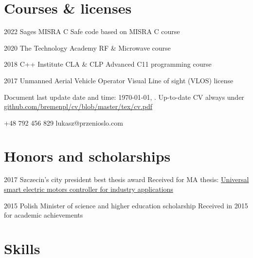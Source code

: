 \documentclass{tccv}
\begin{document}
\section{Courses \& licenses}

\begin{yearlist}

\item{2022}
     {Sages MISRA C}
     {Safe code based on MISRA C course}
     
\item{2020}
     {The Technology Academy}
     {RF \& Microwave course}

\item{2018}
     {C++ Institute CLA \& CLP}
     {Advanced C11 programming course}

\item{2017}
     {Unmanned Aerial Vehicle Operator}
     {Visual Line of sight (VLOS) license}

\end{yearlist}

\vspace*{\fill} %

{\scriptsize Document last update date and time: \today, \currenttime. Up-to-date CV always under  \href{https://github.com/bremenpl/cv/blob/master/tex/cv.pdf}{github.com/bremenpl/cv/blob/master/tex/cv.pdf}}

    {+48 792 456 829}
    {lukasz@przenioslo.com}
    
\section{Honors and scholarships}

\begin{yearlist}

\item{2017}
     {Szczecin's city president best thesis award}
     {Received for MA thesis: \href{https://github.com/bremenpl/praca_mgr}{Universal smart electric motors controller for industry applications}} 
     
\item{2015}
     {Polish Minister of science and higher education scholarship}
     {Received in 2015 for academic achievements} 
    
\end{yearlist}

\section{Skills}
\end{document}
